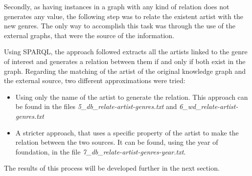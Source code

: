 Secondly, as having instances in a graph with any kind of relation does not generates any value, the following step was to relate the existent artist with the new genres. The only way to accomplish this task was through the use of the external graphs, that were the source of the information. 

Using SPARQL, the approach followed extracts all the artists linked to the genre of interest and generates a relation between them if and only if both exist in the graph. Regarding the matching of the artist of the original knowledge graph and the external source, two different approximations were tried: 

\begin{itemize}
\item Using only the name of the artist to generate the relation. This approach can be found in the files \textit{5\_db\_relate-artist-genres.txt} and \textit{6\_wd\_relate-artist-genres.txt}

\item A stricter approach, that uses a specific property of the artist to make the relation between the two sources. It can be found, using the year of foundation, in the file \textit{7\_db\_relate-artist-genres-year.txt}.
\end{itemize}

The results of this process will be developed further in the next section.